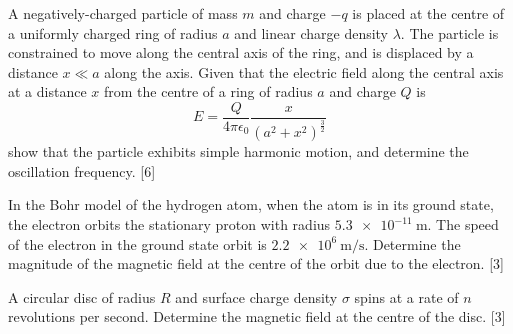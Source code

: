 \begin{problem}
    \begin{subproblem}
        A negatively-charged particle of mass $m$ and charge $-q$ is placed at the centre of a uniformly charged ring of radius $a$ and linear charge density $\lambda$. The particle is constrained to move along the central axis of the ring, and is displaced by a distance $x\ll a$ along the axis. Given that the electric field along the central axis at a distance $x$ from the centre of a ring of radius $a$ and charge $Q$ is
        \[E=\frac{Q}{4 \pi \epsilon_{0}} \frac{x}{\left(a^{2}+x^{2}\right)^{\frac{3}{2}}}\]
        show that the particle exhibits simple harmonic motion, and determine the oscillation frequency.
    \hfill{[6]}\end{subproblem}
    \begin{subproblem}
        In the Bohr model of the hydrogen atom, when the atom is in its ground state, the electron orbits the stationary proton with radius $\qty{5.3e-11}{\m}$. The speed of the electron in the ground state orbit is $\qty{2.2e6}{\m\per\s}$. Determine the magnitude of the magnetic field at the centre of the orbit due to the electron.
    \hfill{[3]}\end{subproblem}
    \begin{subproblem}
        A circular disc of radius $R$ and surface charge density $\sigma$ spins at a rate of $n$ revolutions per second. Determine the magnetic field at the centre of the disc.
    \hfill{[3]}\end{subproblem}
\end{problem}

